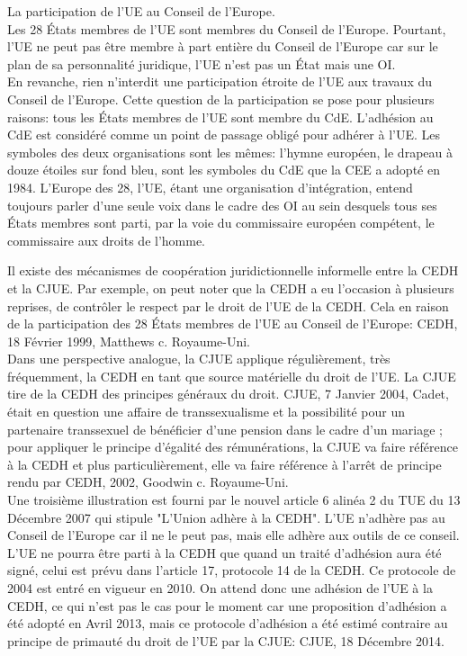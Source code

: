 \documentclass[10pt, a4paper, openany]{book}
\begin{document}
La participation de l'UE au Conseil de l'Europe. \\
Les 28 États membres de l'UE sont membres du Conseil de l'Europe. Pourtant, l'UE ne peut pas être membre à part entière du Conseil de l'Europe car sur le plan de sa personnalité juridique, l'UE n'est pas un État mais une OI. \\
En revanche, rien n'interdit une participation étroite de l'UE aux travaux du Conseil de l'Europe. Cette question de la participation se pose pour plusieurs raisons: tous les États membres de l'UE sont membre du CdE. L'adhésion au CdE est considéré comme un point de passage obligé pour adhérer à l'UE. Les symboles des deux organisations sont les mêmes: l'hymne européen, le drapeau à douze étoiles sur fond bleu, sont les symboles du CdE que la CEE a adopté en 1984. L'Europe des 28, l'UE, étant une organisation d'intégration, entend toujours parler d'une seule voix dans le cadre des OI au sein desquels tous ses États membres sont parti, par la voie du commissaire européen compétent, le commissaire aux droits de l'homme.


Il existe des mécanismes de coopération juridictionnelle informelle entre la CEDH et la CJUE. Par exemple, on peut noter que la CEDH a eu l'occasion à plusieurs reprises, de contrôler le respect par le droit de l'UE de la CEDH. Cela en raison de la participation des 28 États membres de l'UE au Conseil de l'Europe: CEDH, 18 Février 1999, Matthews c. Royaume-Uni. \\
Dans une perspective analogue, la CJUE applique régulièrement, très fréquemment, la CEDH en tant que source matérielle du droit de l'UE. La CJUE tire de la CEDH des principes généraux du droit. CJUE, 7 Janvier 2004, Cadet, était en question une affaire de transsexualisme et la possibilité pour un partenaire transsexuel de bénéficier d'une pension dans le cadre d'un mariage ; pour appliquer le principe d'égalité des rémunérations, la CJUE va faire référence à la CEDH et plus particulièrement, elle va faire référence à l'arrêt de principe rendu par CEDH, 2002, Goodwin c. Royaume-Uni. \\
Une troisième illustration est fourni par le nouvel article 6 alinéa 2 du TUE du 13 Décembre 2007 qui stipule "L'Union adhère à la CEDH". L'UE n'adhère pas au Conseil de l'Europe car il ne le peut pas, mais elle adhère aux outils de ce conseil. L'UE ne pourra être parti à la CEDH que quand un traité d'adhésion aura été signé, celui est prévu dans l'article 17, protocole 14 de la CEDH. Ce protocole de 2004 est entré en vigueur en 2010. On attend donc une adhésion de l'UE à la CEDH, ce qui n'est pas le cas pour le moment car une proposition d'adhésion a été adopté en Avril 2013, mais ce protocole d'adhésion a été estimé contraire au principe de primauté du droit de l'UE par la CJUE: CJUE, 18 Décembre 2014. 
\end{document}
